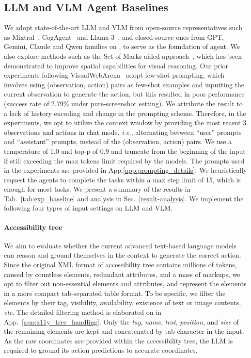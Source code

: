 \subsection{LLM and VLM Agent Baselines}
\label{baselines}

We adopt state-of-the-art LLM and VLM from open-source representatives such as Mixtral~\citep{jiang2024mixtral}, CogAgent~\citep{hong2023cogagent} and Llama-3~\citep{meta2024llama3}, and closed-source ones from GPT, Gemini, Claude and Qwen families on \ours, to serve as the foundation of agent.
We also explore methods such as the Set-of-Marks aided approach~\citep{yang2023set, gpt4vact}, which has been demonstrated to improve spatial capabilities for visual reasoning.
Our prior experiments following VisualWebArena~\citep{Koh2024VisualWebArenaEM} adopt few-shot prompting, which involves using (observation, action) pairs as few-shot examples and inputting the current observation to generate the action, but this resulted in poor performance (success rate of 2.79\% under pure-screenshot setting).
We attribute the result to a lack of history encoding and change in the prompting scheme.
Therefore, in the experiments, we opt to utilize the context window by providing the most recent 3 observations and actions in chat mode, \textit{i.e.}, alternating between ``user'' prompts and ``assistant'' prompts, instead of the (observation, action) pairs.
We use a temperature of 1.0 and top-p of 0.9 and truncate from the beginning of the input if still exceeding the max tokens limit required by the models.
The prompts used in the experiments are provided in App.\ref{app:prompting_details}.
We heuristically request the agents to complete the tasks within a max step limit of 15, which is
enough for most tasks.
We present a summary of the results in Tab.~\ref{tab:exp_baseline} and analysis in Sec.~\ref{result-analysis}.
We implement the following four types of input settings on LLM and VLM.

\paragraph{Accessibility tree}
We aim to evaluate whether the current advanced text-based language models can reason and ground themselves in the context to generate the correct action. 
Since the original XML format of accessibility tree contains millions of tokens, caused by countless
elements, redundant attributes, and a mass of markups, we opt to filter out
non-essential elements and attributes, and represent the elements in a more compact
tab-separated table format. To be specific, we filter the elements by their 
tag, visibility, availability, existence of text or image contents, \textit{etc}.
The detailed filtering method is elaborated on in 
App.~\ref{app:a11y_tree_handling}.
Only the \textit{tag}, \textit{name}, \textit{text}, \textit{position}, and \textit{size} of
the remaining elements are kept and concatenated by tab character in the input.
As the raw coordinates are provided within the accessibility tree, the LLM is
required to ground its action predictions to accurate coordinates.

